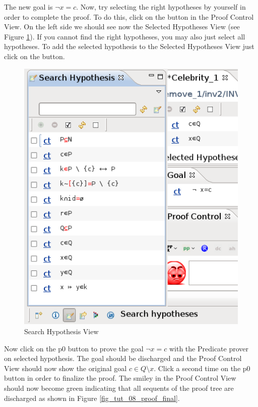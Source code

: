 
The new goal is $\lnot x = c$. Now, try selecting the right hypotheses by yourself in order to complete the proof. To do this, click on the  button in the \textsf{Proof Control View}. On the left side we should see now the \textsf{Selected Hypotheses View} (see Figure \ref{fig_tut_08_search_hypothesis}). If you cannot find the right hypotheses, you may also just select all hypotheses. To add the selected hypothesis to the \textsf{Selected Hypotheses View} just click on the  button. 

\begin{figure}[!ht]
\begin{center}
	\includegraphics{img/tutorial/tut_08_search_hypothesis.png}
	\caption{Search Hypothesis View}
	\label{fig_tut_08_search_hypothesis}
\end{center}
\end{figure}

Now click on the \textsf{p0} button to prove the goal $\lnot x = c$ with the \textsf{Predicate prover on selected hypothesis}. The goal should be discharged and the \textsf{Proof Control View} should now show the original goal $c \in Q \setminus {x}$. Click a second time on the \textsf{p0} button in order to finalize the proof. The smiley in the \textsf{Proof Control View} should now become green indicating that all sequents of the proof tree are discharged as shown in Figure \ref{fig_tut_08_proof_final}.


